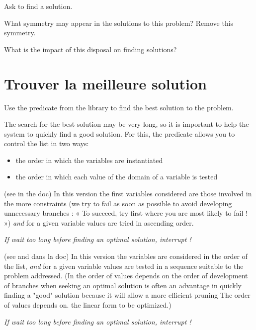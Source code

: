 \begin{question} \label{TP3_Qfin}
Ask \eclipse{} to find a solution.
\end{question}


\begin{question}\label{Qsym}
What symmetry may appear in the solutions to this problem? Remove this symmetry.

What is the impact of this disposal on finding solutions?
\end{question}

\section{Trouver la meilleure solution}

\begin{question}
 Use the predicate  from the library  to find the best solution to the problem.
\end{question}

The search for the best solution may be very long, so it is important to help the system to quickly find a good solution. For this, the predicate  allows you to control the list in two ways:
\begin{itemize}
 \item the order in which the variables are instantiated
 \item the order in which each value of the domain of a variable is tested
\end{itemize}


\begin{version}\label{v1} (see  in the doc)
In this version the first variables considered are those involved in the more constraints (we try to fail as soon as possible to avoid developing unnecessary branches
: « To succeed, try first where you are most likely to fail ! »)
\emph{and} for a given variable values are tried in ascending order.

\emph{If wait too long before finding an optimal solution, interrupt !}
\end{version}


\begin{version}\label{v2} (see  and  dans la doc)
In this version the variables are considered in the order of the list, \emph{and} for a given variable values are tested in a sequence suitable to the problem addressed. (In the order of values depends on the order of development of branches when seeking an optimal solution is often an advantage in quickly finding a "good" solution because it will allow a more efficient pruning The order of values depends on. the linear form to be optimized.)

\emph{If wait too long before finding an optimal solution, interrupt !}
\end{version}

